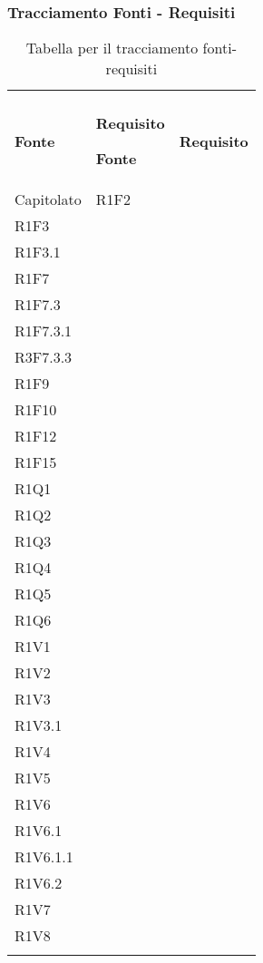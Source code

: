\subsubsection{Tracciamento Fonti - Requisiti}

\renewcommand{\arraystretch}{2.2}

\begin{longtable}{|C{6.5cm}|C{6.5cm}|}

	\caption{Tabella per il tracciamento fonti-requisiti}\\
	\textbf{Fonte} & \textbf{Requisito}
	\endfirsthead
	
	\hline
	\textbf{Fonte} & \textbf{Requisito}
	\tabularnewline
	\endhead

	Capitolato &
	\centering
	R1F2\\
	R1F3 \\
	R1F3.1\\
	R1F7\\
	R1F7.3\\
	R1F7.3.1\\
	R3F7.3.3\\
	R1F9\\
	R1F10\\
	R1F12\\
	R1F15\\
	R1Q1\\
	R1Q2\\
	R1Q3\\
	R1Q4\\
	R1Q5\\
	R1Q6\\
	R1V1\\
	R1V2\\
	R1V3\\
	R1V3.1\\
	R1V4\\
	R1V5\\
	R1V6\\
	R1V6.1\\
	R1V6.1.1\\
	R1V6.2\\
	R1V7\\
	R1V8\\

	\tabularnewline


\end{longtable}
